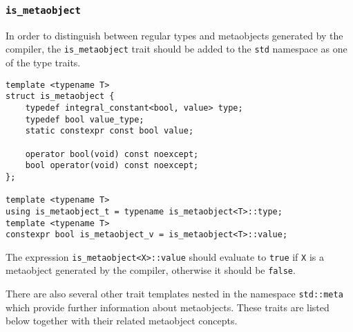 \subsubsection{\texttt{is\_metaobject}}

In order to distinguish between regular types and metaobjects generated
by the compiler, the \texttt{is\_metaobject} trait should be added
to the \texttt{std} namespace as one of the type traits. 

\begin{verbatim}
template <typename T>
struct is_metaobject {
	typedef integral_constant<bool, value> type;
	typedef bool value_type;
	static constexpr const bool value;

	operator bool(void) const noexcept;
	bool operator(void) const noexcept;
};

template <typename T>
using is_metaobject_t = typename is_metaobject<T>::type;
template <typename T>
constexpr bool is_metaobject_v = is_metaobject<T>::value;
\end{verbatim}

The expression \texttt{is\_metaobject<X>::value} should evaluate to \texttt{true}
if \texttt{X} is a metaobject generated by the compiler, otherwise it should
be \texttt{false}.

There are also several other trait templates nested in the namespace
\texttt{std::meta} which provide further information about metaobjects.
These traits are listed below together with their related metaobject concepts.
